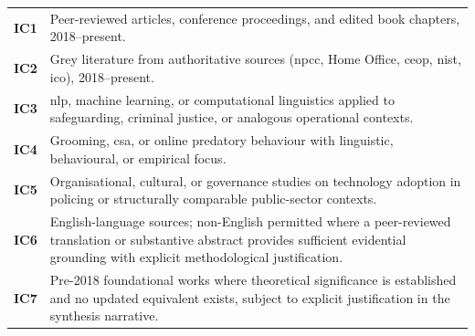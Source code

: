 \begingroup
\captionsetup{hypcap=false}
\label{tab:inclusion-criteria}
\endgroup
\begin{tcolorbox}[
  enhanced,
  breakable,
  colback=white,
  colframe=incgreen,
  title={\textbf{Inclusion Criteria}},
  fonttitle=\small\bfseries,
  coltitle=white,
  attach boxed title to top left={yshift=-2mm, xshift=6mm},
  boxed title style={colback=incgreen, colframe=incgreen},
  top=6pt, bottom=6pt, left=8pt, right=8pt,
  before upper={\small}
]
\setlength{\tabcolsep}{0pt}%
\begin{tabular}{%
  @{}%
  >{\bfseries\arraybackslash}p{0.9cm}%
  >{\arraybackslash}p{\dimexpr\tcbtextwidth-0.9cm\relax}%
  @{}%
}
IC1 & Peer-reviewed articles, conference proceedings, and edited book chapters, 2018--present. \\[3pt]
IC2 & Grey literature from authoritative sources (\gls{npcc}, Home Office, \gls{ceop}, \gls{nist}, \gls{ico}), 2018--present. \\[3pt]
IC3 & \gls{nlp}, machine learning, or computational linguistics applied to safeguarding, criminal justice, or analogous operational contexts. \\[3pt]
IC4 & Grooming, \gls{csa}, or online predatory behaviour with linguistic, behavioural, or empirical focus. \\[3pt]
IC5 & Organisational, cultural, or governance studies on technology adoption in policing or structurally comparable public-sector contexts. \\[3pt]
IC6 & English-language sources; non-English permitted where a peer-reviewed translation or substantive abstract provides sufficient evidential grounding with explicit methodological justification. \\[3pt]
IC7 & Pre-2018 foundational works where theoretical significance is established and no updated equivalent exists, subject to explicit justification in the synthesis narrative. \\
\end{tabular}
\end{tcolorbox}